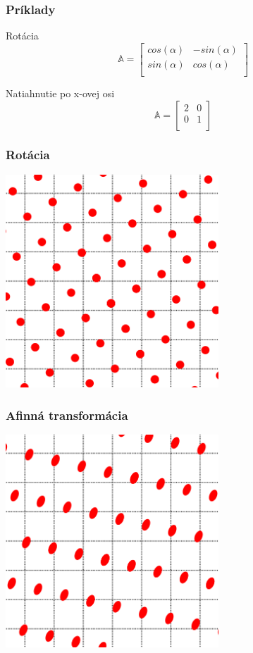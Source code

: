 \documentclass{beamer}
\begin{document}
\begin{frame}
\centering
\frametitle{Príklady}
\begin{block}{Rotácia}
$$ \mathbb{A} = \begin{bmatrix}
    cos(\alpha)       & -sin(\alpha)  \\
    sin(\alpha)       & cos(\alpha)  \\   
\end{bmatrix}$$
\end{block}

\begin{block}{Natiahnutie po x-ovej osi}
$$ \mathbb{A} = \begin{bmatrix}
    2       & 0  \\
    0       & 1  \\   
\end{bmatrix}$$
\end{block}
\end{frame}

\begin{frame}
\centering
\frametitle{Rotácia}
\includegraphics[width=0.6\textwidth]{rotate.png}
\end{frame}

\begin{frame}
\centering
\frametitle{Afinná transformácia}
\includegraphics[width=0.6\textwidth]{afine.png}
\end{frame}
\end{document}
